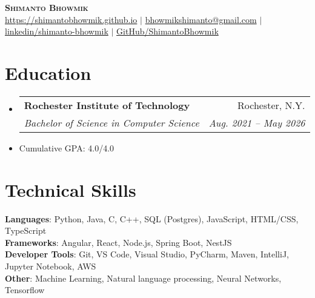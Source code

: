 \documentclass[letterpaper,11pt]{article}
\makeatletter
\newcommand{\resumeItem}[1]{
  \item\small{
    {#1 \vspace{-2pt}}
  }
}
\newcommand{\resumeSubheading}[4]{
  \vspace{-2pt}\item
    \begin{tabular*}{0.97\textwidth}[t]{l@{\extracolsep{\fill}}r}
      \textbf{#1} & #2 \\
      \textit{\small#3} & \textit{\small #4} \\
    \end{tabular*}\vspace{-7pt}
}
\newcommand{\resumeSubHeadingListStart}{\begin{itemize}[leftmargin=0.15in, label={}]}
\newcommand{\resumeSubHeadingListEnd}{\end{itemize}}
\makeatother
\begin{document}

\begin{center}
    \textbf{\Huge \scshape Shimanto Bhowmik} \\ \vspace{1pt}
    \href{https://shimantobhowmik.github.io}{\small{https://shimantobhowmik.github.io}} $|$ 
    \href{mailto:bhowmikshimanto@gmail.com}{\small{bhowmikshimanto@gmail.com}} $|$ 
    \href{https://www.linkedin.com/in/shimantobhowmik/}{\small{linkedin/shimanto-bhowmik}} $|$ 
    \href{https://github.com/ShimantoBhowmik}{\small{GitHub/ShimantoBhowmik}}
\end{center}




\section{Education}
\resumeSubHeadingListStart
\resumeSubheading
{Rochester Institute of Technology}{Rochester, N.Y.}
{Bachelor of Science in Computer Science}{Aug. 2021 -- May 2026}
\resumeItem{Cumulative GPA: 4.0/4.0}
\resumeSubHeadingListEnd

%
\section{Technical Skills}
\begin{itemize}[leftmargin=0.15in, label={}]
    \small{\item{
        \textbf{Languages}{: Python, Java, C, C++, SQL (Postgres), JavaScript, HTML/CSS, TypeScript} \\
        \textbf{Frameworks}{: Angular, React, Node.js, Spring Boot, NestJS} \\
        \textbf{Developer Tools}{: Git, VS Code, Visual Studio, PyCharm, Maven, IntelliJ, Jupyter Notebook, AWS} \\
        \textbf{Other}{: Machine Learning, Natural language processing, Neural Networks, Tensorflow}
    }}
\end{itemize}
\vfill
\end{document}
